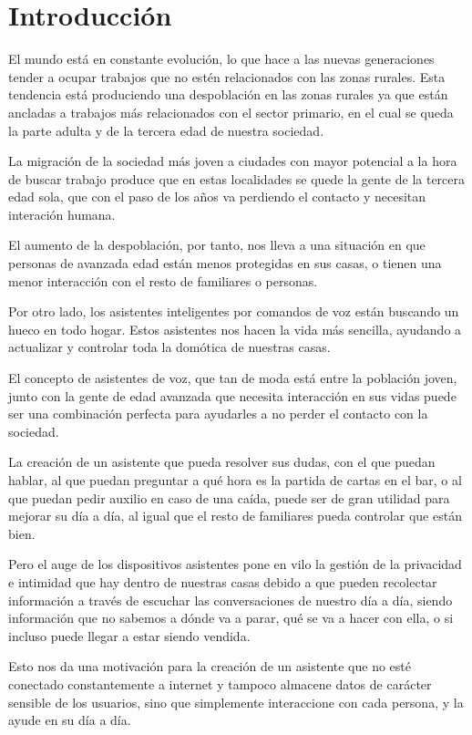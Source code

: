 \section{Introducción}

El mundo está en constante evolución, lo que hace a las nuevas generaciones tender a ocupar trabajos que no estén relacionados con las zonas rurales. Esta tendencia está produciendo una despoblación en las zonas rurales ya que están ancladas a trabajos más relacionados con el sector primario, en el cual se queda la parte adulta y de la tercera edad de nuestra sociedad.

La migración de la sociedad más joven a ciudades con mayor potencial a la hora de buscar trabajo produce que en estas localidades se quede la gente de la tercera edad sola, que con el paso de los años va perdiendo el contacto y necesitan interación humana.

El aumento de la despoblación, por tanto, nos lleva a una situación en que personas de avanzada edad están menos protegidas en sus casas, o tienen una menor interacción con el resto de familiares o personas.

Por otro lado, los asistentes inteligentes por comandos de voz están buscando un hueco en todo hogar. Estos asistentes nos hacen la vida más sencilla, ayudando a actualizar y controlar toda la domótica de nuestras casas.

El concepto de asistentes de voz, que tan de moda está entre la población joven, junto con la gente de edad avanzada que necesita interacción en sus vidas puede ser una combinación perfecta para ayudarles a no perder el contacto con la sociedad.

La creación de un asistente que pueda resolver sus dudas, con el que puedan hablar, al que puedan preguntar a qué hora es la partida de cartas en el bar, o al que puedan pedir auxilio en caso de una caída, puede ser de gran utilidad
para mejorar su día a día, al igual que el resto de familiares pueda controlar que están bien.

Pero el auge de los dispositivos asistentes pone en vilo la gestión de la privacidad e intimidad que hay dentro de nuestras casas debido a que pueden recolectar información a través de escuchar las conversaciones de nuestro día a día, siendo información que no sabemos a dónde va a parar, qué se va a hacer con ella, o si incluso puede llegar a estar siendo vendida.

Esto nos da una motivación para la creación de un asistente que no esté conectado constantemente a internet y tampoco almacene datos de carácter sensible de los usuarios, sino que simplemente interaccione con cada persona, y la ayude en su día a día.


